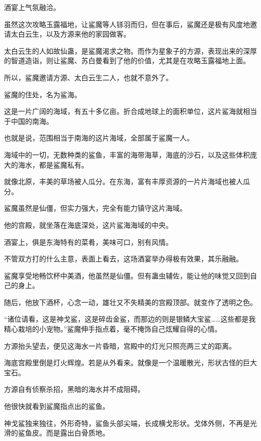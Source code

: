 
\begin{this_body}

酒宴上气氛融洽。

虽然这次攻略玉露福地，让鲨魔等人铩羽而归，但在事后，鲨魔还是极有风度地邀请太白云生，以及方源来他的家园做客。

太白云生的人如故仙蛊，是鲨魔渴求之物。而作为星象子的方源，表现出来的深厚的智道造诣，则让鲨魔、苏白曼看到了他的价值，尤其是在攻略玉露福地上面。

所以，鲨魔邀请方源、太白云生二人，也就不意外了。

鲨魔的住处，名为鲨海。

这是一片广阔的海域，有五十多亿亩。折合成地球上的面积单位，这片鲨海就相当于中国的南海。

也就是说，范围相当于南海的这片海域，全部属于鲨魔一人。

海域中的一切，无数种类的鲨鱼，丰富的海带海草，海底的沙石，以及这些体积庞大的海水，都是鲨魔私有。

就像北原，丰美的草场被人瓜分。在东海，富有丰厚资源的一片片海域也被人瓜分。

鲨魔虽然是仙僵，但实力强大，完全有能力镇守这片海域。

他的宫殿，就坐落在海底深处，这片鲨海海域的中央。

酒宴上，俱是东海特有的菜肴，美味可口，别有风情。

不管双方打的什么主意，表面上看去，这场酒宴举办得极有效果，其乐融融。

鲨魔享受地畅饮杯中美酒，他虽然是仙僵。但有蛊虫辅佐，能让他的味觉又回到自己的身上。

随后，他放下酒杯，心念一动，雄壮又不失精美的宫殿顶部。就变作了透明之色。

“诸位请看，这是神戈鲨，这是碎齿金鲨，而那边的则是银鳞大宝鲨……这些都是我精心栽培的小宠物。”鲨魔伸手指点着，毫不掩饰自己炫耀自得的心情。

方源抬头望去，便见这海水一片昏暗，宫殿中的灯光只照亮两三丈的距离。

海底宫殿里倒是灯火辉煌。若是从外看来。就像是一个温暖散光，形状古怪的巨大宝石。

方源自有侦察杀招，黑暗的海水并不成阻碍。

他很快就看到鲨魔指点出的鲨鱼。

神戈鲨独来独往，外形奇特，鲨鱼头部尖端，长成横戈形状。戈体外侧，不再是光滑的鲨鱼皮。而是露出白骨质地。


\end{this_body}
